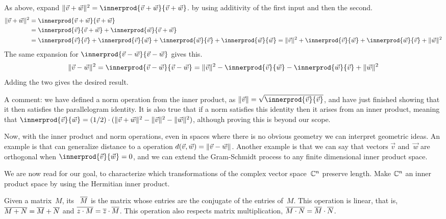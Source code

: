 As above, expand
$
  \norm{\vec{v}+\vec{w}}^2=\innerprod{\vec{v}+\vec{w}}{\vec{v}+\vec{w}}
$.
by using additivity of the first input and then the second. 
\begin{align*}
  \norm{\vec{v}+\vec{w}}^2
  &=\innerprod{\vec{v}+\vec{w}}{\vec{v}+\vec{w}}           \\
  &=\innerprod{\vec{v}}{\vec{v}+\vec{w}}+\innerprod{\vec{w}}{\vec{v}+\vec{w}} \\
  &=\innerprod{\vec{v}}{\vec{v}}            
   +\innerprod{\vec{v}}{\vec{w}}
   +\innerprod{\vec{w}}{\vec{v}}
   +\innerprod{\vec{w}}{\vec{w}}
  =\norm{\vec{v}}^2            
   +\innerprod{\vec{v}}{\vec{w}}
   +\innerprod{\vec{w}}{\vec{v}}
   +\norm{\vec{w}}^2
\end{align*}
The same expansion for $\innerprod{\vec{v}-\vec{w}}{\vec{v}-\vec{w}}$
gives this.
\begin{equation*}
  \norm{\vec{v}-\vec{w}}^2
  =\innerprod{\vec{v}-\vec{w}}{\vec{v}-\vec{w}}
  =\norm{\vec{v}}^2
   -\innerprod{\vec{v}}{\vec{w}}
   -\innerprod{\vec{w}}{\vec{v}}
   +\norm{\vec{w}}^2
\end{equation*}
Adding the two gives the desired result. 

A comment: we have defined a norm operation from the inner product, 
as $\norm{\vec{v}}=\sqrt{\smashdp{\innerprod{\vec{v}}{\vec{v}}}}$,
and have just finished showing that it then satisfies the
parallelogram identity.
It is also true that if a norm satisfies this identity then it
arises from an inner product, 
meaning that 
$\innerprod{\vec{v}}{\vec{w}}
  =(1/2)\cdot(\norm{\vec{v}+\vec{w}}^2-\norm{\vec{v}}^2-\norm{\vec{w}}^2)$,
although proving this is beyond our scope.

Now, with the inner product and norm operations, 
even in spaces where there is no obvious geometry
we can interpret geometric ideas. 
An example is that can generalize distance to a
operation
$d(\vec{v},\vec{w})=\lVert\vec{v}-\vec{w}\rVert$.
Another example is that we can say that
vectors $\vec{v}$ and~$\vec{w}$ are orthogonal when 
$\innerprod{\vec{v}}{\vec{w}}=0$,
and we can extend the Gram-Schmidt process
to any finite dimensional inner product space.

We are now read for our goal, to characterize which transformations
of the complex vector space~$\mathbb{C}^n$ preserve length.
Make $\mathbb{C}^n$ an inner product space by using the Hermitian inner product.

Given a matrix~$M$, its 
~$\overline{M}$ 
is the matrix whose entries are the conjugate of the entries of~$M$.
This operation is linear, that is, 
$\overline{M+N}=\overline{M}+\overline{N}$ and 
$\overline{z\cdot M}=\overline{z}\cdot\overline{M}$.
This operation also respects matrix multiplication, 
$\overline{M\cdot N}=\overline{M}\cdot\overline{N}$.  

